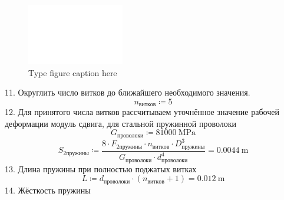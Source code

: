 \documentclass{article}
\newcommand{\defeq}{\coloneq} %
\begin{document}
\begin{figure}[h!]
 \begin{center}
  \includegraphics[max width=\textwidth]{calculations/692.png}
  \caption{Type figure caption here}
  \label{fig:692}
 \end{center}
\end{figure}
\colorbox[HTML]{000000}{11. Округлить число витков до ближайшего необходимого значения.}\newline
\begin{equation*}
n_{витков} \defeq 5
\end{equation*}
\colorbox[HTML]{000000}{12. Для принятого числа витков рассчитываем уточнённое значение рабочей деформации }\newline
\colorbox[HTML]{000000}{модуль сдвига, для стальной пружинной проволоки }\newline
\begin{equation*}
G_{проволоки} \defeq 81000 \: \mathrm{MPa}
\end{equation*}
\begin{equation*}
\textit{S}_{\textit{2пружины}} \defeq \frac{8 \cdot \textit{F}_{\textit{2пружины}} \cdot n_{витков} \cdot D_{пружины}^{3}}{G_{проволоки} \cdot d_{проволоки}^{4}} = {0.0044 \: \mathrm{m}}
\end{equation*}
\colorbox[HTML]{000000}{13. Длина пружины при полностью поджатых витках }\newline
\begin{equation*}
L \defeq d_{проволоки} \cdot \left( n_{витков}+1 \right) = {0.012 \: \mathrm{m}}
\end{equation*}
\colorbox[HTML]{000000}{14. Жёсткость пружины}\newline
\end{document}
